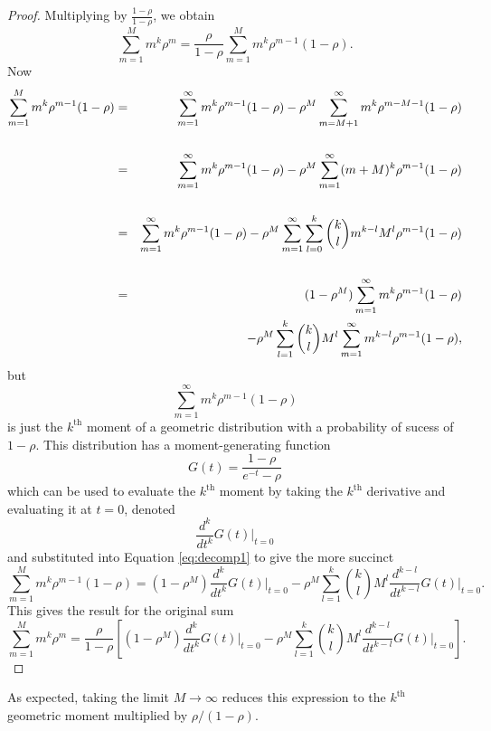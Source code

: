 \documentclass[letterpaper,12pt,oneside,final]{article}
\begin{document}
\begin{proof}
Multiplying by $\frac{1 - \rho}{1 - \rho}$, we obtain
$$\sum_{m = 1}^{M} m^k \rho^m = \frac{\rho}{1 - \rho} \sum_{m = 1}^{M} m^k \rho^{m-1} (1 - \rho).$$
Now
\begin{eqnarray}
    \sum_{m = 1}^{M} m^k \rho^{m-1} (1 - \rho) & = & \sum_{m = 1}^{\infty} m^k \rho^{m-1} (1 - \rho) - \rho^{M} \sum_{m = M + 1}^{\infty} m^k \rho^{m - M - 1} (1 - \rho) \nonumber \\
    & & \nonumber \\
    & = & \sum_{m = 1}^{\infty} m^k \rho^{m-1} (1 - \rho) - \rho^{M}\sum_{m = 1}^{\infty} (m + M)^k \rho^{m - 1} (1 - \rho) \nonumber \\
    & & \nonumber \\
    & = & \sum_{m = 1}^{\infty} m^k \rho^{m-1} (1 - \rho) - \rho^{M} \sum_{m = 1}^{\infty} \sum_{l = 0}^k {k \choose l} m^{k-l} M^l \rho^{m - 1} (1 - \rho) \nonumber \\
    & & \nonumber \\
    & = & (1 - \rho^M) \sum_{m = 1}^{\infty} m^k \rho^{m-1} (1 - \rho) \nonumber \\
    & & \hspace{0.5cm}- \rho^{M} \sum_{l = 1}^k {k \choose l} M^l \sum_{m = 1}^{\infty}  m^{k-l} \rho^{m - 1} (1 - \rho),  \label{eq:decomp1}
\end{eqnarray}
but
$$\sum_{m = 1}^{\infty} m^k \rho^{m-1} (1 - \rho)$$
is just the $k^{\text{th}}$ moment of a geometric distribution with a probability of sucess of $1 - \rho$. This distribution has a moment-generating function
\begin{equation} \label{eq:geoMGF}
G(t) = \frac{1 - \rho}{e^{-t} - \rho}
\end{equation}
which can be used to evaluate the $k^{\text{th}}$ moment by taking the $k^{\text{th}}$ derivative and evaluating it at $t = 0$, denoted
\begin{equation*} 
\frac{d^k}{dt^k} G(t) \Big |_{t = 0}
\end{equation*}
and substituted into Equation \ref{eq:decomp1} to give the more succinct
\begin{equation} \label{eq:sumByMoments}
  \sum_{m = 1}^{M} m^k \rho^{m-1} (1 - \rho) = (1 - \rho^M) \frac{d^k}{dt^k} G(t) \Big |_{t = 0} - \rho^{M} \sum_{l = 1}^k {k \choose l} M^l \frac{d^{k-l}}{dt^{k-l}} G(t) \Big |_{t = 0}.
\end{equation}
This gives the result for the original sum
\begin{equation} \label{eq:kfirstmoments}
 \sum_{m = 1}^{M} m^k \rho^m = \frac{\rho}{1 - \rho} \left [ (1 - \rho^M) \frac{d^k}{dt^k} G(t) \Big |_{t = 0} - \rho^{M} \sum_{l = 1}^k {k \choose l} M^l \frac{d^{k-l}}{dt^{k-l}} G(t) \Big |_{t = 0} \right ].
\end{equation}
\end{proof}
As expected, taking the limit $M \rightarrow \infty$ reduces this expression to the $k^{\text{th}}$ geometric moment multiplied by $\rho/(1 - \rho)$.
\end{document}

